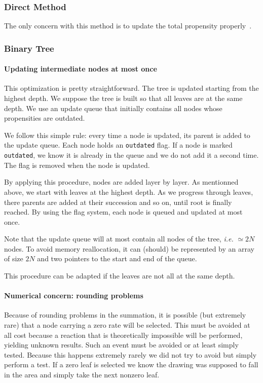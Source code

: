 \subsubsection{Direct Method}
The only concern with this method is to update the total propensity properly~.

\subsubsection{Binary Tree}

\paragraph{Updating intermediate nodes at most once}
This optimization is pretty straightforward. The tree is updated starting from the highest depth. We suppose the tree is built so that all leaves are at the same depth. We use an update queue that initially contains all nodes whose propensities are outdated.

We follow this simple rule: every time a node is updated, its parent is added to the update queue. Each node holds an \texttt{outdated} flag. If a node is marked \texttt{outdated}, we know it is already in the queue and we do not add it a second time. The flag is removed when the node is updated.

By applying this procedure, nodes are added layer by layer. As mentionned above, we start with leaves at the highest depth. As we progress through leaves, there parents are added at their succession and so on, until root is finally reached. By using the flag system, each node is queued and updated at most once.

Note that the update queue will at most contain all nodes of the tree, \textit{i.e.} $\simeq 2N$ nodes. To avoid memory reallocation, it can (should) be represented by an array of size $2N$ and two pointers to the start and end of the queue.

This procedure can be adapted if the leaves are not all at the same depth.

\paragraph{Numerical concern: rounding problems}

Because of rounding problems in the summation, it is possible (but extremely rare) that a node carrying a zero rate will be selected. This must be avoided at all cost because a reaction that is theoretically impossible will be performed, yielding unknown results. Such an event must be avoided or at least simply tested. Because this happens extremely rarely we did not try to avoid but simply perform a test. If a zero leaf is selected we know the drawing was supposed to fall in the area and simply take the next nonzero leaf.

